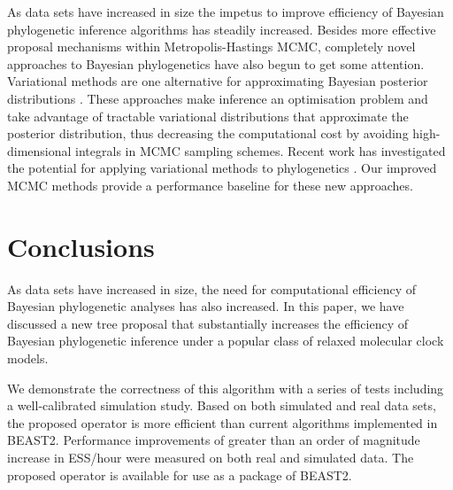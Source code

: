 \documentclass{bmcart}
\begin{document}
As data sets have increased in size the impetus to improve efficiency of Bayesian phylogenetic inference algorithms has steadily increased. Besides more effective proposal mechanisms within Metropolis-Hastings MCMC, completely novel approaches to Bayesian phylogenetics have also begun to get some attention. Variational methods are one alternative for approximating Bayesian posterior distributions \cite{beal2003variational}. These approaches make inference an optimisation problem and take advantage of tractable variational distributions that approximate the posterior distribution, thus decreasing the computational cost by avoiding high-dimensional integrals in MCMC sampling schemes. Recent work has investigated the potential for applying variational methods to phylogenetics \cite{zhang2018variational,dang2019stochastic}. Our improved MCMC methods provide a performance baseline for these new approaches.

\section*{Conclusions}
As data sets have increased in size, the need for computational efficiency of Bayesian phylogenetic analyses has also increased. In this paper, we have discussed a new tree proposal that substantially increases the efficiency of Bayesian phylogenetic inference under a popular class of relaxed molecular clock models.

We demonstrate the correctness of this algorithm with a series of tests including a well-calibrated simulation study. Based on both simulated and real data sets, the proposed operator is more efficient than current algorithms implemented in BEAST2. Performance improvements of greater than an order of magnitude increase in ESS/hour were measured on both real and simulated data. The proposed operator is available for use as a package of BEAST2.
\end{document}
